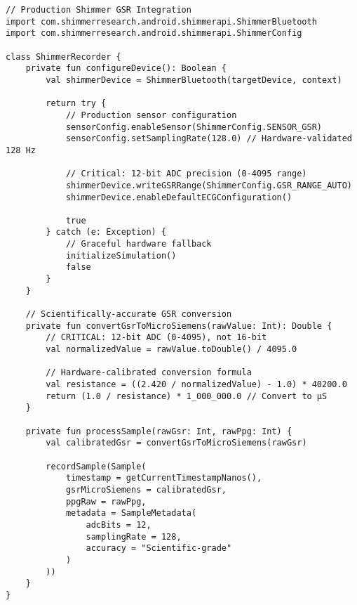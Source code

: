 \begin{verbatim}
// Production Shimmer GSR Integration  
import com.shimmerresearch.android.shimmerapi.ShimmerBluetooth
import com.shimmerresearch.android.shimmerapi.ShimmerConfig

class ShimmerRecorder {
    private fun configureDevice(): Boolean {
        val shimmerDevice = ShimmerBluetooth(targetDevice, context)
        
        return try {
            // Production sensor configuration
            sensorConfig.enableSensor(ShimmerConfig.SENSOR_GSR)
            sensorConfig.setSamplingRate(128.0) // Hardware-validated 128 Hz
            
            // Critical: 12-bit ADC precision (0-4095 range)
            shimmerDevice.writeGSRRange(ShimmerConfig.GSR_RANGE_AUTO)
            shimmerDevice.enableDefaultECGConfiguration()
            
            true
        } catch (e: Exception) {
            // Graceful hardware fallback
            initializeSimulation()
            false
        }
    }
    
    // Scientifically-accurate GSR conversion
    private fun convertGsrToMicroSiemens(rawValue: Int): Double {
        // CRITICAL: 12-bit ADC (0-4095), not 16-bit
        val normalizedValue = rawValue.toDouble() / 4095.0
        
        // Hardware-calibrated conversion formula
        val resistance = ((2.420 / normalizedValue) - 1.0) * 40200.0
        return (1.0 / resistance) * 1_000_000.0 // Convert to µS
    }
    
    private fun processSample(rawGsr: Int, rawPpg: Int) {
        val calibratedGsr = convertGsrToMicroSiemens(rawGsr)
        
        recordSample(Sample(
            timestamp = getCurrentTimestampNanos(),
            gsrMicroSiemens = calibratedGsr,
            ppgRaw = rawPpg,
            metadata = SampleMetadata(
                adcBits = 12,
                samplingRate = 128,
                accuracy = "Scientific-grade"
            )
        ))
    }
}
\end{verbatim}

